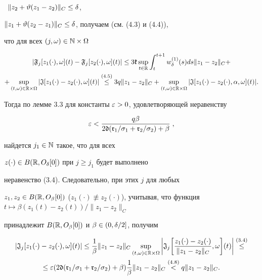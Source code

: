 \ $\|z_{2}+\vartheta(z_{1}-z_{2})\|_{C}\le\delta$,


$\|z_{1}+\vartheta(z_{2}-z_{1})\|_{C}\le\delta$, получаем (см. (4.3) и (4.4)),


что для всех $(j,\omega)\in\Bbb N\times\Omega$


\begin{multline*}


|\frak F_{j}[z_{1}(\cdot),\om](t)-\frak F_{j}[z_{2}(\cdot),\om](t)|\le


3\frak k\sup\lt_{t\in\R}\int_{t}^{t+1}w_{\dl}^{(1)}(s)ds


\|z_{1}-z_{2}\|_{C}+ \\


%


+\sup\lt_{(t,\om)\in\R\times\Om}


|\frak J[z_{1}(\cdot)-z_{2}(\cdot),\om](t)|\overset{(4.5)}{\le}{}


3q\|z_{1}-z_{2}\|_{C}+\sup\lt_{(t,\om)\in\R\times\Om}


|\frak J[z_{1}(\cdot)-z_{2}(\cdot),\alpha,\om](t)|.


\end{multline*}


Тогда по лемме 3.3 для константы $\varepsilon>0$, удовлетворяющей неравенству


\begin{equation}


\ve<\frac{q\beta}{2\frak d(\frak r_{1}/\sigma_{1}+


\frak r_{2}/\sigma_{2})+\beta}\;,


\end{equation}


найдется $j_{1}\in\Bbb N$ такое, что для всех


$z(\cdot)\in B(\Bbb R,O_{\delta}[0])$ при $j\ge j_{1}$ будет выполнено


неравенство (3.4). Следовательно, при этих $j$ для любых


$z_{1}, z_{2}\in B(\R,O_{\beta}[0])$ ($z_{1}(\cdot)


\not\equiv z_{2}(\cdot)$), учитывая, что функция $t\mapsto\beta


(z_{1}(t)- z_{2}(t))/\|z_{1}- z_{2}\|_{C}$


принадлежит $B(\Bbb R,O_{\beta}[0])$ и $\beta\in(0,\delta/2]$, получим


\begin{multline*}


|\frak J_{j}[z_{1}(\cdot)-z_{2}(\cdot),\om](t)|\le


\frac{1}{\beta}\|z_{1}- z_{2}\|_{C}\sup\lt_{(t,\om)\in\R\times\Om}


\bigg|\frak J_{j}\bigg[


\frac{z_{1}(\cdot)-z_{2}(\cdot)}{\|z_{1}- z_{2}\|_{C}},\om\bigg](t)\bigg|


\overset{(3.4)}{\le} \\


%


\le\ve(2\frak d(\frak r_{1}/\sigma_{1}+\frak r_{2}/\sigma_{2})+\beta)


\frac{1}{\beta}\|z_{1}- z_{2}\|_{C}\overset{(4.8)}{<}{}


q\|z_{1}- z_{2}\|_{C}.


\end{multline*}


